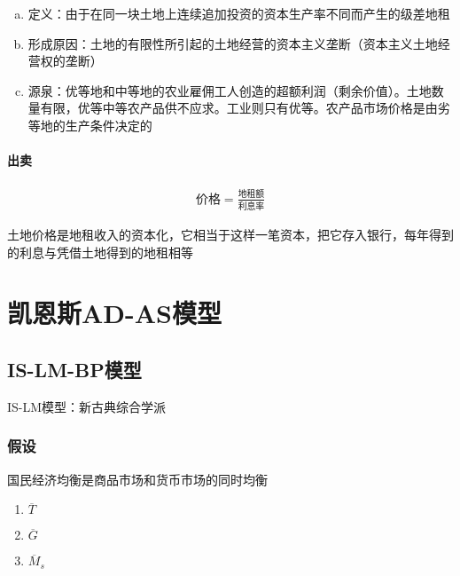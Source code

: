 \documentclass[12pt]{book}
\begin{document}
\begin{enumerate}[1.]
\begin{enumerate}[(1)]
\begin{enumerate}[a.]
                        \item 定义：由于在同一块土地上连续追加投资的资本生产率不同而产生的级差地租
                        \item 形成原因：土地的有限性所引起的土地经营的资本主义垄断（资本主义土地经营权的垄断）
                        \item 源泉：优等地和中等地的农业雇佣工人创造的超额利润（剩余价值）。土地数量有限，优等中等农产品供不应求。工业则只有优等。农产品市场价格是由劣等地的生产条件决定的
                    \end{enumerate}
          \end{enumerate}
\end{enumerate}











\subsubsection{出卖}

\begin{gather*}
    \text{价格}=\frac{\text{地租额}}{\text{利息率}}
\end{gather*}


土地价格是地租收入的资本化，它相当于这样一笔资本，把它存入银行，每年得到的利息与凭借土地得到的地租相等



\chapter{凯恩斯AD-AS模型}\label{chapter:凯恩斯AD-AS模型}


\section{IS-LM-BP模型}

IS-LM模型：新古典综合学派



\subsection{假设}
国民经济均衡是商品市场和货币市场的同时均衡

\begin{enumerate}[1.]
    \item $\overline{T}$
    \item $\overline{G}$
    \item $\overline{M}_s$ 
\end{enumerate}
\end{document}
